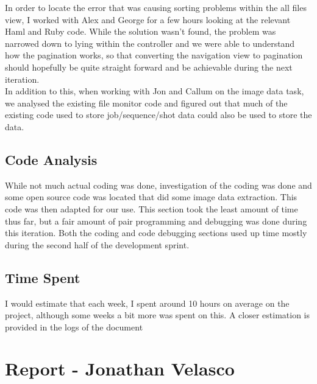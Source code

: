 \documentclass{article}
\begin{document}
In order to locate the error that was causing sorting problems within the all files view, I worked with Alex and George for a few hours looking at the relevant Haml and Ruby code. While the solution wasn’t found, the problem was narrowed down to lying within the controller and we were able to understand how the pagination works, so that converting the navigation view to pagination should hopefully be quite straight forward and be achievable during the next iteration.\\
In addition to this, when working with Jon and Callum on the image data task, we analysed the existing file monitor code and figured out that much of the existing code used to store job/sequence/shot data could also be used to store the data.\\

\subsection{Code Analysis}

While not much actual coding was done, investigation of the coding was done and some open source code was located that did some image data extraction. This code was then adapted for our use. This section took the least amount of time thus far, but a fair amount of pair programming and debugging was done during this iteration. Both the coding and code debugging sections used up time mostly during the second half of the development sprint.\\

\subsection{Time Spent}

I would estimate that each week, I spent around 10 hours on average on the project, although some weeks a bit more was spent on this. A closer estimation is provided in the logs of the document\\

\newpage{}

\section{Report - Jonathan Velasco}

\end{document}
